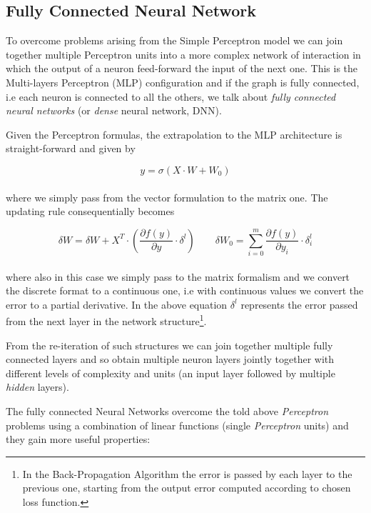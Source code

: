 \documentclass{standalone}
\begin{document}
\subsection[Fully Connected Neural Network]{Fully Connected Neural Network}\label{NN:connected}

To overcome problems arising from the Simple Perceptron model we can join together multiple Perceptron units into a more complex network of interaction in which the output of a neuron feed-forward the input of the next one.
This is the Multi-layers Perceptron (MLP) configuration and if the graph is fully connected, i.e each neuron is connected to all the others, we talk about \emph{fully connected neural networks} (or \emph{dense} neural network, DNN).

Given the Perceptron formulas, the extrapolation to the MLP architecture is straight-forward and given by

$$
y = \sigma\left(X \cdot W + W_0 \right)
$$
\\
where we simply pass from the vector formulation to the matrix one.
The updating rule consequentially becomes

$$
\delta W = \delta W + X^T \cdot \left( \frac{\partial f(y)}{\partial y} \cdot \delta^l \right)  \quad\quad \delta W_0 = \sum_{i=0}^{m}\frac{\partial f(y)}{\partial y_i} \cdot \delta_i^l
$$
\\
where also in this case we simply pass to the matrix formalism and we convert the discrete format to a continuous one, i.e with continuous values we convert the error to a partial derivative.
In the above equation $\delta^l$ represents the error passed from the next layer in the network structure\footnote{
  In the Back-Propagation Algorithm the error is passed by each layer to the previous one, starting from the output error computed according to chosen loss function.
}.

From the re-iteration of such structures we can join together multiple fully connected layers and so obtain multiple neuron layers jointly together with different levels of complexity and units (an input layer followed by multiple \emph{hidden} layers).

The fully connected Neural Networks overcome the told above \emph{Perceptron} problems using a combination of linear functions (single \emph{Perceptron} units) and they gain more useful properties:
\end{document}

